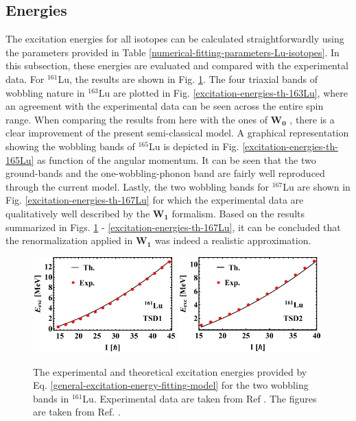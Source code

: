 \subsection{Energies}

The excitation energies for all isotopes can be calculated straightforwardly using the parameters provided in Table \ref{numerical-fitting-parameters-Lu-isotopes}. In this subsection, these energies are evaluated and compared with the experimental data. For $^{161}$Lu, the results are shown in Fig. \ref{excitation-energies-th-161Lu}. The four triaxial bands of wobbling nature in $^{163}$Lu are plotted in Fig. \ref{excitation-energies-th-163Lu}, where an agreement with the experimental data can be seen across the entire spin range. When comparing the results from here with the ones of $\mathbf{W_0}$ \cite{raduta2017semiclassical}, there is a clear improvement of the present semi-classical model. A graphical representation showing the wobbling bands of $^{165}$Lu is depicted in Fig. \ref{excitation-energies-th-165Lu} as function of the angular momentum. It can be seen that the two ground-bands and the one-wobbling-phonon band are fairly well reproduced through the current model. Lastly, the two wobbling bands for $^{167}$Lu are shown in Fig. \ref{excitation-energies-th-167Lu} for which the experimental data are qualitatively well described by the $\mathbf{W_1}$ formalism. Based on the results summarized in Figs. \ref{excitation-energies-th-161Lu} - \ref{excitation-energies-th-167Lu}, it can be concluded that the renormalization applied in $\mathbf{W_1}$ was indeed a realistic approximation.
\begin{figure}
    \centering
    \includegraphics[width=0.49\textwidth]{Chapters/Figures/Lu-exp-energies/fig2a_lu161.pdf}
    \includegraphics[width=0.49\textwidth]{Chapters/Figures/Lu-exp-energies/fig2b_lu161.pdf}
    \caption{The experimental and theoretical excitation energies provided by Eq. \ref{general-excitation-energy-fitting-model} for the two wobbling bands in $^{161}$Lu. Experimental data are taken from Ref \cite{bringel2005evidence}. The figures are taken from Ref. \cite{raduta2020approach}.}
    \label{excitation-energies-th-161Lu}
\end{figure}
